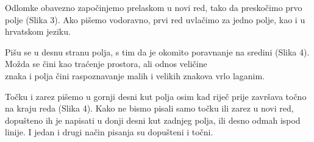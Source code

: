 	\newpage
		
	Odlomke obavezno započinjemo prelaskom u novi red, tako da preskočimo prvo polje (Slika 3). Ako pišemo vodoravno, prvi red uvlačimo za jedno polje, kao i u hrvatskom jeziku.

	
	Pišu se u desnu stranu polja, s tim da je okomito poravnanje na sredini (Slika 4). Možda se čini kao traćenje prostora, ali odnos veličine\\ znaka i polja čini raspoznavanje malih i velikih znakova vrlo laganim.
	
	
	
	Točku i zarez pišemo u gornji desni kut polja osim kad riječ prije završava točno na kraju reda (Slika 4). Kako ne bismo pisali samo točku ili zarez u novi red, dopušteno ih je napisati u donji desni kut zadnjeg polja, ili desno odmah ispod linije. I jedan i drugi način pisanja su dopušteni i točni.
	
